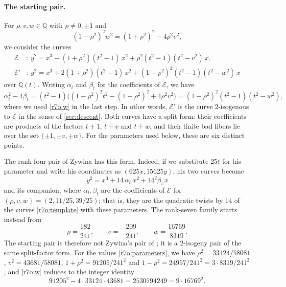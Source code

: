 \documentclass[12pt,oneside,openany]{book}
\theoremstyle{definition}
\theoremstyle{plain}
\numberwithin{equation}{chapter}
\theoremstyle{plain}
\theoremstyle{definition}
\theoremstyle{remark}
\newcommand{\Q}{\mathbb Q}
\begin{document}
\paragraph{The starting pair.} For $\rho,v,w\in\Q$ with $\rho\ne0,\pm1$ and
\begin{equation}\label{r7o:w}
 (1-\rho^2)^2w^2=(1+\rho^2)^2-4\rho^2v^2,
\end{equation}
we consider the curves
\begin{equation}\label{r7o:template}
\begin{aligned}
 \mathcal E&:\ y^2=x^3-(1+\rho^2)(t^2-1)\,x^2+\rho^2(t^2-1)(t^2-v^2)\,x,\\
 \mathcal E'&:\ y^2=x^3+2(1+\rho^2)(t^2-1)\,x^2+(1-\rho^2)^2(t^2-1)(t^2-w^2)\,x
\end{aligned}
\end{equation}
over $\Q(t)$. Writing $\alpha_t$ and $\beta_t$ for the coefficients of
$\mathcal E$, we have
\[
 \alpha_t^2-4\beta_t=(t^2-1)\bigl((1-\rho^2)^2t^2-(1+\rho^2)^2+4\rho^2v^2\bigr)
 =(1-\rho^2)^2(t^2-1)(t^2-w^2),
\]
where we used \eqref{r7o:w} in the last step. In other words, $\mathcal E'$ is the
curve $2$-isogenous to $\mathcal E$ in the sense of \cref{sec:descent}. Both
curves have a split form: their coefficients are products of the factors
$t\mp1$, $t\mp v$ and $t\mp w$, and their finite bad fibers lie over
the set $\{\pm1,\pm v,\pm w\}$. For the parameters used below, these are six
distinct points.

The rank-four pair of Zywina \cite[\S6.5]{Zywina2026} has this form.
Indeed, if we substitute $25t$ for his parameter and write his coordinates
as $(625x,15625y)$, his two curves become
\[
 y^2=x^3+14\,\alpha_t\,x^2+14^2\beta_t\,x
\]
and its companion, where $\alpha_t,\beta_t$ are the coefficients of
$\mathcal E$ for $(\rho,v,w)=(2,11/25,39/25)$; that is, they are the
quadratic twists by $14$ of the curves \eqref{r7o:template} with these
parameters. %
The rank-seven family starts instead from
\begin{equation}\label{r7o:parameters}
 \rho=\frac{182}{241},\qquad v=-\frac{209}{241},\qquad w=\frac{16769}{8319}.
\end{equation}
The starting pair is therefore not Zywina's pair of \cite[\S6.5]{Zywina2026}; it
is a $2$-isogeny pair of the same split-factor form. For the values
\eqref{r7o:parameters}, we have $\rho^2=33124/58081$,
$v^2=43681/58081$, $1+\rho^2=91205/241^2$ and
$1-\rho^2=24957/241^2=3\cdot8319/241^2$, and \eqref{r7o:w} reduces to the
integer identity
\[
 91205^2-4\cdot33124\cdot43681=2530794249=9\cdot16769^2.
\]
\end{document}
